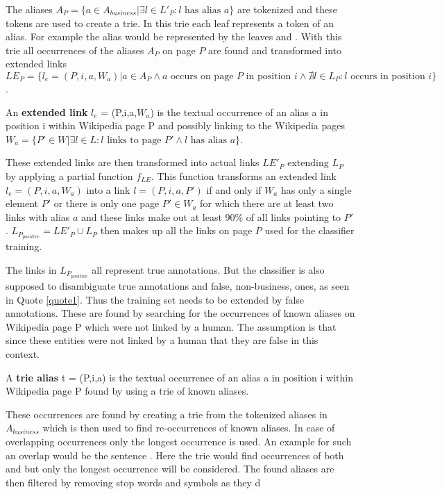 The aliases $A_P = \{a \in A_{business} | \exists l \in L'_P: l \text{ has alias } a \}$ are tokenized and these tokens are used to create a trie. In this trie each leaf represents a token of an alias. For example the alias  would be represented by the leaves  and . With this trie all occurrences of the aliases $A_P$ on page $P$ are found and transformed into extended links $LE_P = \{ l_e = (P, i, a, W_a) | a \in A_P \land a \text{ occurs on page } P \text{ in position } i \land \nexists l \in L_P: l \text{ occurs in position } i \}$.
\begin{definition}
An \textbf{extended link} $l_e$ = (P,i,a,$W_a$) is the textual occurrence of an alias a in position i within Wikipedia page P and possibly linking to the Wikipedia pages $W_a = \{ P' \in W | \exists l \in L: l \text{ links to page } P' \land l \text{ has alias } a \}$.
\end{definition}
These extended links are then transformed into actual links $LE'_P$ extending $L_P$ by applying a partial function $f_{LE}$.
This function transforms an extended link $l_e = (P,i,a,W_a)$ into a link $l = (P,i,a,P')$ if and only if $W_a$ has only a single element $P'$ or there is only one page $P' \in W_a$ for which there are at least two links with alias $a$ and these links make out at least 90\% of all links pointing to $P'$. $L_{P_{positive}} = LE'_P \cup L_P$ then makes up all the links on page $P$ used for the classifier training.\par
The links in $L_{P_{positive}}$ all represent true annotations. But the classifier is also supposed to disambiguate true annotations and false, non-business, ones, as seen in Quote \ref{quote1}. Thus the training set needs to be extended by false annotations. These are found by searching for the occurrences of known aliases on Wikipedia page P which were not linked by a human. The assumption is that since these entities were not linked by a human that they are false in this context.
\begin{definition}
A \textbf{trie alias} t = (P,i,a) is the textual occurrence of an alias a in position i within Wikipedia page P found by using a trie of known aliases.
\end{definition}
These occurrences are found by creating a trie from the tokenized aliases in $A_{business}$ which is then used to find re-occurrences of known aliases. In case of overlapping occurrences only the longest occurrence is used. An example for such an overlap would be the sentence . Here the trie would find occurrences of both  and  but only the longest occurrence will be considered. The found aliases are then filtered by removing stop words and symbols as they d

